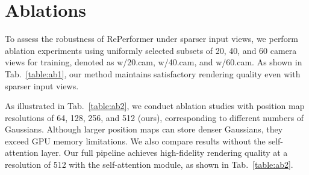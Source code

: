 \begin{table}[t]
	\begin{center}
		\centering
		\vspace{20pt}

            \caption{
            Quantitative Ablation Study on the resolution of position maps.
            }
		\label{table:ab2}
        \vspace{-10pt}
	\end{center}
\end{table}



\section{Ablations} \label{suppl:ablation} 
 To assess the robustness of RePerformer under sparser input views, we perform ablation experiments using uniformly selected subsets of 20, 40, and 60 camera views for training, denoted as w/20.cam, w/40.cam, and w/60.cam. As shown in Tab.~\ref{table:ab1}, our method maintains satisfactory rendering quality even with sparser input views.

 As illustrated in Tab.~\ref{table:ab2}, we conduct ablation studies with position map resolutions of 64, 128, 256, and 512 (ours), corresponding to different numbers of Gaussians. Although larger position maps can store denser Gaussians, they exceed GPU memory limitations. We also compare results without the self-attention layer. Our full pipeline achieves high-fidelity rendering quality at a resolution of 512 with the self-attention module, as shown in Tab.~\ref{table:ab2}. 

